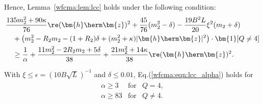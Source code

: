 Hence, Lemma~\ref{wfcma:lem:lcc} holds under the following condition:
\begin{align}
	&\frac{135 m_2^2+90\kappa}{76}\re(\bm{h}\herm\bm{z})^2+\frac{45}{76}(m_2^2-\delta)-\frac{19B^2L}{20}\xi^2(  m_2+\delta)\nonumber\\
	&\quad+\big( m_2^2-R_2m_2-(1+R_2)\delta+(m_2^2+\kappa)|\bm{h}\herm\bm{z}|^2\big)\cdot\bm{1}[Q\neq 4] \nonumber\\
	&\quad\geq  \frac{1}{\alpha}+\frac{11m_2^2-2R_2m_2+5\delta}{38} +   \frac{21m_2^2+14\kappa}{38}\re(\bm{h}\herm\bm{z})^2.\label{wfcma:eqn:lcc_alpha}
\end{align}

With $\xi\leq\epsilon=(10B\sqrt{L})^{-1}$ and $\delta\leq0.01$, Eq.(\ref{wfcma:eqn:lcc_alpha}) holds for 
\begin{align}
	\begin{array}{lcc}
		\alpha\geq 3&\text{for}&Q=4,\\
		\alpha\geq 83&\text{for}&Q\neq4.\\
	\end{array}	\nonumber
\end{align} 

